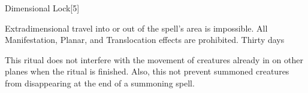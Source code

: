 \begin{spellsection}{Dimensional Lock}[5]
    \begin{spellheader}
    \end{spellheader}
    \begin{spellcontent}
        \begin{spelltargetinginfo}
        \end{spelltargetinginfo}
        \begin{spelleffects}
            \spelleffect Extradimensional travel into or out of the spell's area is impossible.
            All Manifestation, Planar, and Translocation effects are prohibited.
            \spelldur Thirty days
        \end{spelleffects}
    \end{spellcontent}
    \begin{spellfooter}
        \spellnotes This ritual does not interfere with the movement of creatures already in on other planes when the ritual is finished. Also, this not prevent summoned creatures from disappearing at the end of a summoning spell.
    \end{spellfooter}
\end{spellsection}

